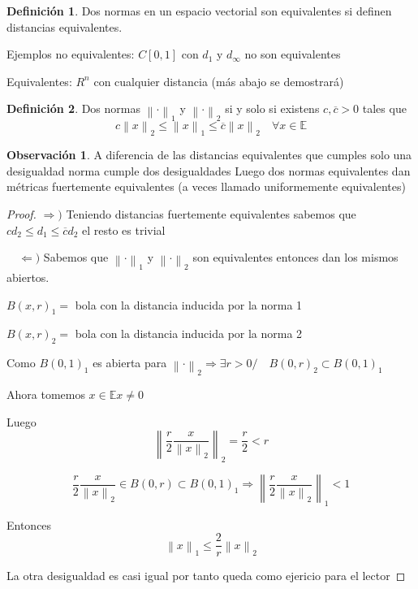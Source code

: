 \documentclass[12pt]{article}
\newcommand{\E}{\mathbb{E}}
\newcommand{\Ra}{\Rightarrow}
\newcommand{\ol}{\overline}
\newcommand{\norm}[1]{\left\lVert#1\right\rVert}
\theoremstyle{definition}
\newtheorem{definition}{Definición}[section]
\newtheorem*{remark}{Observación}
\begin{document}
      \begin{definition}
	Dos normas en un espacio vectorial son equivalentes si definen distancias equivalentes.

	Ejemplos no equivalentes: $C[0,1]$ con $d_{1}$ y $d_{\infty} $ no son equivalentes

	Equivalentes: $R^n$ con cualquier distancia (más abajo se demostrará)
      
      \end{definition}

      \begin{definition}
	Dos normas $\norm{\cdot}_{1}$ y $\norm{\cdot}_{2}$ si y solo si existens $c, \ol c > 0$ tales que 
	$$ c \norm{x}_{2} \leq \norm{x}_{1} \leq \ol c \norm{x}_{2} \quad \forall x \in \E $$
      
      \end{definition}
      \begin{remark}
	A diferencia de las distancias equivalentes que cumples solo una desigualdad norma cumple dos desigualdades
	Luego dos normas equivalentes dan métricas fuertemente equivalentes (a veces llamado uniformemente equivalentes)

\begin{proof}
$\Ra)$ Teniendo distancias fuertemente equivalentes sabemos que $c d_{2} \leq d_{1} \leq \ol c d_{2}$ el resto es trivial

$\quad \Leftarrow) $ Sabemos que $\norm{\cdot}_{1}$ y $\norm{\cdot}_{2}$ son equivalentes entonces dan los mismos abiertos. 

$ B(x,r)_{1} =$ bola con la distancia inducida por la norma 1

	$B(x,r)_{2}=$ bola con la distancia inducida por la norma 2

	Como $B(0,1)_{1}$ es abierta para $\norm{\cdot}_{2} $$\Ra \exists r > 0/ \quad B(0,r)_{2} \subset B(0,1)_{1}$

	Ahora tomemos $x \in \E x \neq 0$ 

	Luego $$ \norm{\frac{r}{2} \frac{x}{\norm{x}_{2}}}_{2} = \frac{r}{2} < r$$

	$$\frac{r}{2} \frac{x}{\norm{x}_{2}} \in B(0,r) \subset B(0,1)_{1} \Ra \norm{\frac{r}{2} \frac{x}{\norm{x}_{2}}}_{1} < 1 $$

	Entonces $$ \norm{x}_{1} \leq \frac{2}{r} \norm{x}_{2}$$

	La otra desigualdad es casi igual por tanto queda como ejericio para el lector
\end{proof}

\end{remark}
	
\end{document}
